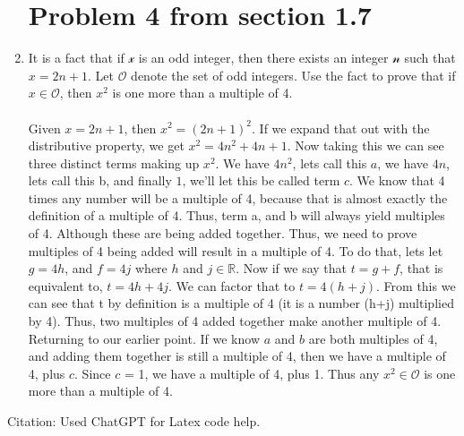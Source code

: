 \documentclass{article}
\begin{document}
\begin{enumerate}
    \newpage

    \section*{Problem 4 from section 1.7}
    \item It is a fact that if $\mathscr{x}$ is an odd integer, then there exists an integer $\mathscr{n}$ such that $x = 2n + 1$. Let $\mathscr{O}$ denote the set of odd integers. Use the fact to prove that if $x \in \mathscr{O}$, then $x^2$ is one more than a multiple of 4.
    \\
    \\
    Given $x = 2n + 1$, then $x^2 = (2n + 1)^2$. If we expand that out with the distributive property, we get $x^2 = 4n^2 + 4n + 1$. Now taking this we can see three distinct terms making up $x^2$. We have $4n^2$, lets call this $a$, we have $4n$, lets call this b, and finally $1$, we'll let this be called term $c$. We know that 4 times any number will be a multiple of 4, because that is almost exactly the definition of a multiple of 4. Thus, term a, and b will always yield multiples of 4. Although these are being added together. Thus, we need to prove multiples of 4 being added will result in a multiple of 4. 
    To do that, lets let $g = 4h$, and $f = 4j$ where $h$ and $j \in \mathbb{R}$. Now if we say that $t = g + f$, that is equivalent to, $t = 4h + 4j$. We can factor that to $t = 4(h + j)$. From this we can see that t by definition is a multiple of 4 (it is a number (h+j) multiplied by 4). Thus, two multiples of 4 added together make another multiple of 4. 
    Returning to our earlier point. If we know $a$ and $b$ are both multiples of 4, and adding them together is still a multiple of 4, then we have a multiple of 4, plus $c$. Since $c$ = 1, we have a multiple of 4, plus 1. Thus any $x^2 \in \mathscr{O}$ is one more than a multiple of 4. 
\end{enumerate}

Citation:
Used ChatGPT for Latex code help.
\end{document}
